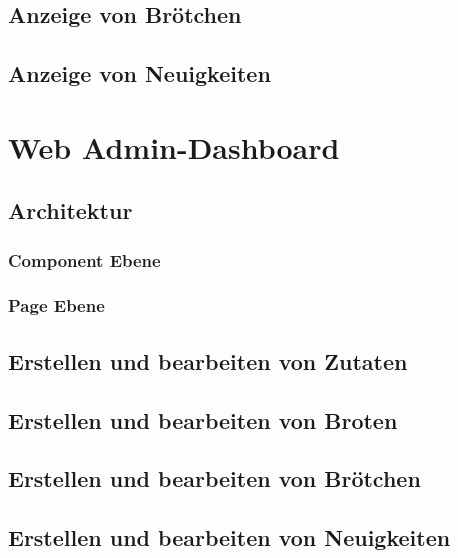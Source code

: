 \clearpage

\subsection{Anzeige von Brötchen}

\clearpage

\subsection{Anzeige von Neuigkeiten}

\clearpage

\section{Web Admin-Dashboard}

\subsection{Architektur}

\subsubsection{Component Ebene}

\clearpage

\subsubsection{Page Ebene}

\clearpage

\subsection{Erstellen und bearbeiten von Zutaten}

\clearpage

\subsection{Erstellen und bearbeiten von Broten}

\clearpage

\subsection{Erstellen und bearbeiten von Brötchen}

\clearpage

\subsection{Erstellen und bearbeiten von Neuigkeiten}

\clearpage
